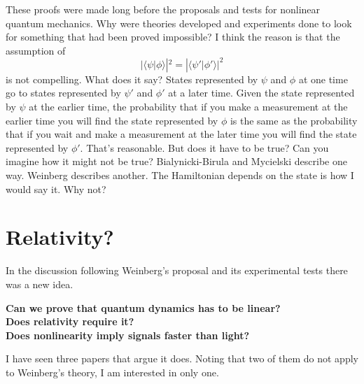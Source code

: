 \documentclass[pra, 12pt, showkeys, eqsecnum]{revtex4}
\begin{document}
These proofs were made long before the proposals and tests for nonlinear quantum mechanics. Why were theories developed and experiments done to look for something that had been proved impossible? I think the reason is that the assumption of
\begin{equation}
|\langle\psi |\phi \rangle |^2 = |\langle\psi '|\phi '\rangle |^2
\end{equation}
is not compelling. What does it say? States represented by $\psi $ and $\phi $ at one time go to states represented by $\psi '$ and $\phi '$ at a later time. Given the state represented by $\psi $ at the earlier time, the probability that if you make a measurement at the earlier time you will find the state represented by $\phi $ is the same as the probability that if you wait and make a measurement at the later time you will find the state represented by $\phi  '$. That's reasonable. But does it have to be true? Can you imagine how it might not be true? Bialynicki-Birula and Mycielski describe one way. Weinberg describes another. The Hamiltonian depends on the state is how I would say it. Why not?

\newpage

\section{Relativity?}\label{four}

In the discussion following Weinberg's proposal and its experimental tests there was a new idea.

\bigskip
\large
\noindent
\textbf{Can we prove that quantum dynamics has to be linear? \\
Does relativity require it? \\
Does nonlinearity imply signals faster than light?} \\
\normalsize 

\noindent I have seen three papers that argue it does. Noting\cite{me80} that two of them\cite{GisinHPA,GisinX3} do not apply to Weinberg's theory, I am interested in only one\cite{GisinExample}.
\end{document}
